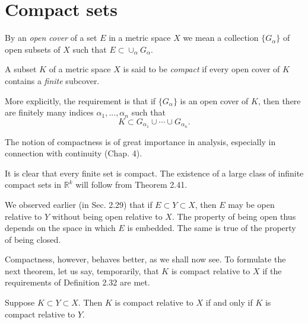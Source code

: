\section{Compact sets}

\begin{myDef}
    \label{myDef:2.31 open cover}
    By an \emph{open cover} of a set $E$ in a metric space $X$ we mean a collection $\{G_{\alpha}\}$ of open subsets of $X$ such that $E \subset \cup_{\alpha} G_{\alpha}$.
\end{myDef}

\begin{myDef}
    \label{myDef:2.32 compact set}
    A subset $K$ of a metric space $X$ is said to be \emph{compact} if every open cover of $K$ contains a \emph{finite} subcover.
\end{myDef}

More explicitly, the requirement is that if $\{G_{\alpha}\}$ is an open cover of $K$, then there are finitely many indices $\alpha_1, ..., \alpha_n$ such that
\begin{equation*}
    K \subset G_{\alpha_{1}} \cup \cdots \cup G_{\alpha_{n}}.
\end{equation*}

The notion of compactness is of great importance in analysis, especially
in connection with continuity (Chap. 4).

It is clear that every finite set is compact. The existence of a large class of infinite compact sets in $\mathbb{R}^k$ will follow from Theorem 2.41.

We observed earlier (in Sec. 2.29) that if $E \subset Y \subset X$, then $E$ may be open relative to $Y$ without being open relative to $X$. The property of being open thus depends on the space in which $E$ is embedded. The same is true of the property of being closed.

Compactness, however, behaves better, as we shall now see. To formulate the next theorem, let us say, temporarily, that $K$ is compact relative to $X$ if the requirements of Definition 2.32 are met.

\begin{thm}
    \label{thm:2.33 compact relative}
    Suppose $K \subset Y \subset X$. Then $K$ is compact relative to $X$ if and only if $K$ is compact relative to $Y$.
\end{thm}

